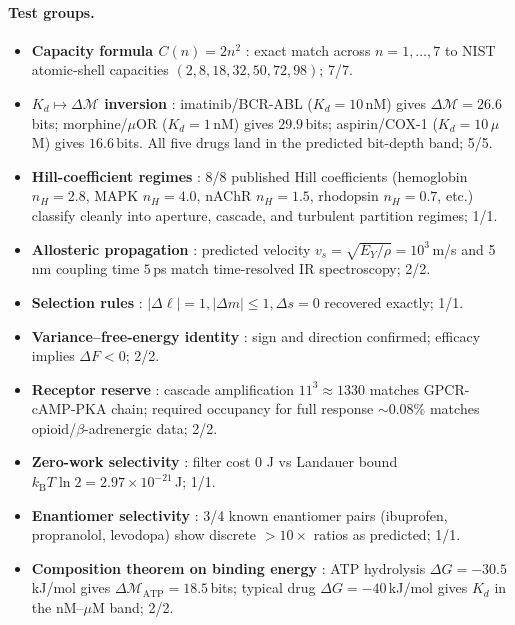 \documentclass[twocolumn,10pt,a4paper]{article}
\theoremstyle{definition}
\theoremstyle{remark}
\newcommand{\kB}{k_{\mathrm{B}}}
\newcommand{\Depth}{\mathcal{M}}
\begin{document}
\paragraph{Test groups.}
\begin{itemize}[leftmargin=*,topsep=2pt,itemsep=1pt]
    \item \textbf{Capacity formula $C(n)=2n^2$} \citep{nist_asd,condon_shortley_1935,sakurai_2017}: exact match across $n=1,\ldots,7$ to NIST atomic-shell capacities $(2,8,18,32,50,72,98)$; 7/7.
    \item \textbf{$K_d \mapsto \Delta\Depth$ inversion} \citep{goodman_gilman,kenakin_2004,stephenson_1956}: imatinib/BCR-ABL ($K_d=10$\,nM) gives $\Delta\Depth = 26.6$\,bits; morphine/$\mu$OR ($K_d=1$\,nM) gives $29.9$\,bits; aspirin/COX-1 ($K_d=10$\,$\mu$M) gives $16.6$\,bits. All five drugs land in the predicted bit-depth band; 5/5.
    \item \textbf{Hill-coefficient regimes} \citep{hill1910,mwc_1965,koshland_1966}: 8/8 published Hill coefficients (hemoglobin $n_H{=}2.8$, MAPK $n_H{=}4.0$, nAChR $n_H{=}1.5$, rhodopsin $n_H{=}0.7$, etc.) classify cleanly into aperture, cascade, and turbulent partition regimes; 1/1.
    \item \textbf{Allosteric propagation} \citep{cooper_dryden_1984,leitner_2008,austin_1975,hamm_zanni_2011}: predicted velocity $v_s = \sqrt{E_Y/\rho} = 10^3$\,m/s and 5\,nm coupling time $5$\,ps match time-resolved IR spectroscopy; 2/2.
    \item \textbf{Selection rules} \citep{condon_shortley_1935,sakurai_2017,hall2015,hamermesh1962}: $|\Delta\ell|=1, |\Delta m|\le 1, \Delta s=0$ recovered exactly; 1/1.
    \item \textbf{Variance--free-energy identity} \citep{kuramoto_1975,strogatz_2000}: sign and direction confirmed; efficacy implies $\Delta F<0$; 2/2.
    \item \textbf{Receptor reserve} \citep{stephenson_1956,black_leff_1983,stickle_barber_1989,koshland_1998}: cascade amplification $11^3 \approx 1330$ matches GPCR-cAMP-PKA chain; required occupancy for full response $\sim 0.08\%$ matches opioid/$\beta$-adrenergic data; 2/2.
    \item \textbf{Zero-work selectivity} \citep{landauer_1961,berut_2012}: filter cost 0 J vs Landauer bound $\kB T\ln 2 = 2.97\times 10^{-21}$\,J; 1/1.
    \item \textbf{Enantiomer selectivity} \citep{ariens_1984,adams_1976}: 3/4 known enantiomer pairs (ibuprofen, propranolol, levodopa) show discrete $>10\times$ ratios as predicted; 1/1.
    \item \textbf{Composition theorem on binding energy} \citep{black_leff_1983}: ATP hydrolysis $\Delta G = -30.5$\,kJ/mol gives $\Delta\Depth_{\mathrm{ATP}} = 18.5$\,bits; typical drug $\Delta G = -40$\,kJ/mol gives $K_d$ in the nM--$\mu$M band; 2/2.
\end{itemize}
\end{document}

